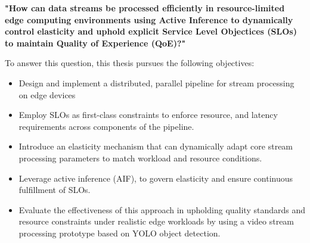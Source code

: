 \textbf{"How can data streams be processed efficiently in resource-limited edge computing
environments using Active Inference to dynamically control elasticity and uphold  explicit Service Level Objectices (SLOs) to maintain Quality of Experience (QoE)?"}

To answer this question, this thesis pursues the following objectives:
\begin{itemize}
    \item Design and implement a distributed, parallel pipeline for stream processing on edge
devices
    \item Employ SLOs as first-class constraints to enforce resource, and latency
requirements across components of the pipeline.
    \item  Introduce an elasticity mechanism that can dynamically adapt core stream
processing parameters to match workload and resource conditions.
    \item Leverage active inference (AIF), to govern elasticity and ensure continuous fulfillment of SLOs.
    \item Evaluate the effectiveness of this approach in upholding quality standards
and resource constraints under realistic edge workloads by using a video stream processing prototype based on YOLO object detection.
\end{itemize}